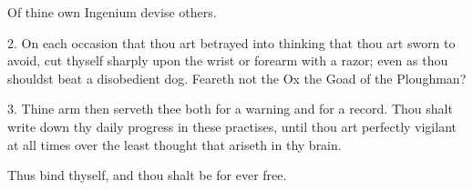 Of thine own Ingenium devise others.

2. On each occasion that thou art betrayed into thinking that thou art sworn to avoid, cut thyself sharply upon the wrist or forearm with a razor; even as thou shouldst beat a disobedient dog. Feareth not the Ox the Goad of the Ploughman?

3. Thine arm then serveth thee both for a warning and for a record. Thou shalt write down thy daily progress in these practises, until thou art perfectly vigilant at all times over the least thought that ariseth in thy brain.

Thus bind thyself, and thou shalt be for ever free.
